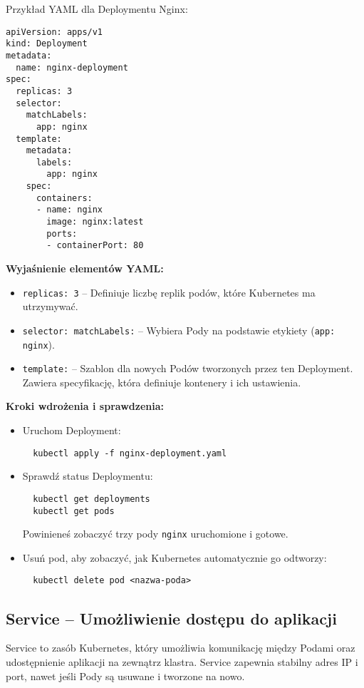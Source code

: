 \documentclass{article}
\begin{document}
Przykład YAML dla Deploymentu Nginx:
\begin{lstlisting}
apiVersion: apps/v1
kind: Deployment
metadata:
  name: nginx-deployment
spec:
  replicas: 3
  selector:
    matchLabels:
      app: nginx
  template:
    metadata:
      labels:
        app: nginx
    spec:
      containers:
      - name: nginx
        image: nginx:latest
        ports:
        - containerPort: 80
\end{lstlisting}

\textbf{Wyjaśnienie elementów YAML:}
\begin{itemize}
  \item \texttt{replicas: 3} – Definiuje liczbę replik podów, które Kubernetes ma utrzymywać.
  \item \texttt{selector: matchLabels:} – Wybiera Pody na podstawie etykiety (\texttt{app: nginx}).
  \item \texttt{template:} – Szablon dla nowych Podów tworzonych przez ten Deployment. Zawiera specyfikację, która definiuje kontenery i ich ustawienia.
\end{itemize}

\textbf{Kroki wdrożenia i sprawdzenia:}
\begin{itemize}
  \item Uruchom Deployment:
  \begin{lstlisting}
  kubectl apply -f nginx-deployment.yaml
  \end{lstlisting}
  \item Sprawdź status Deploymentu:
  \begin{lstlisting}
  kubectl get deployments
  kubectl get pods
  \end{lstlisting}
  Powinieneś zobaczyć trzy pody \texttt{nginx} uruchomione i gotowe.
  \item Usuń pod, aby zobaczyć, jak Kubernetes automatycznie go odtworzy:
  \begin{lstlisting}
  kubectl delete pod <nazwa-poda>
  \end{lstlisting}
\end{itemize}

\subsection{Service – Umożliwienie dostępu do aplikacji}
Service to zasób Kubernetes, który umożliwia komunikację między Podami oraz udostępnienie aplikacji na zewnątrz klastra. Service zapewnia stabilny adres IP i port, nawet jeśli Pody są usuwane i tworzone na nowo.
\end{document}
